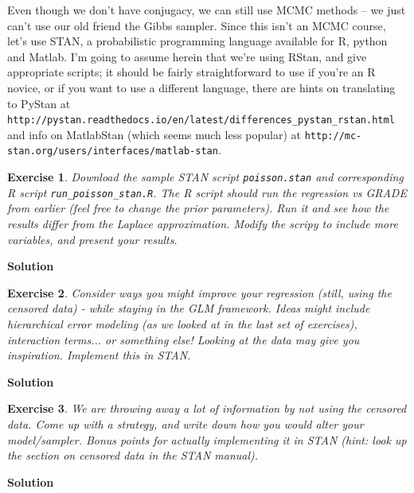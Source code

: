 \documentclass[twoside]{article}
\newcounter{lecnum}
\newtheorem{exercise}{Exercise}[lecnum]
\begin{document}
      Even though we don't have conjugacy, we can still use MCMC methods -- we just can't use our old friend the Gibbs sampler. Since this isn't an MCMC course, let's use STAN, a probabilistic programming language available for R, python and Matlab. I'm going to assume herein that we're using RStan, and give appropriate scripts; it should be fairly straightforward to use if you're an R novice, or if you want to use a different language, there are hints on translating to PyStan at \\ \texttt{http://pystan.readthedocs.io/en/latest/differences\_pystan\_rstan.html} and info on MatlabStan (which seems much less popular) at \texttt{http://mc-stan.org/users/interfaces/matlab-stan}.
  \begin{exercise}
    Download the sample STAN script \texttt{poisson.stan} and corresponding R script \texttt{run\_poisson\_stan.R}. The R script should run the  regression vs GRADE from earlier (feel free to change the prior parameters). Run it and see how the results differ from the Laplace approximation. Modify the scripy to include more variables, and present your results.
  \end{exercise}

{\color{blue}
	\textbf{Solution}
	
	
} %

  
  \begin{exercise}
    Consider ways you might improve your regression (still, using the censored data) - while staying in the GLM framework.  Ideas might include hierarchical error modeling (as we looked at in the last set of exercises), interaction terms... or something else! Looking at the data may give you inspiration. Implement this in STAN.
  \end{exercise}


{\color{blue}
	\textbf{Solution}
	
	
} %

 
  
  \begin{exercise}
    We are throwing away a lot of information by not using the censored data. Come up with a strategy, and write down how you would alter your model/sampler. Bonus points for actually implementing it in STAN (hint: look up the section on censored data in the STAN manual).
  \end{exercise}


{\color{blue}
	\textbf{Solution}
	
	
} %


  
  
\end{document}
